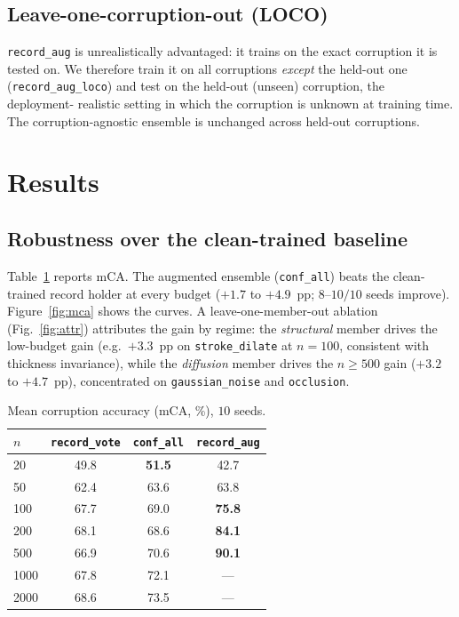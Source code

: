 \documentclass[conference]{IEEEtran}
\begin{document}
\subsection{Leave-one-corruption-out (LOCO)}
\texttt{record\_aug} is unrealistically advantaged: it trains on the exact corruption it is
tested on. We therefore train it on all corruptions \emph{except} the held-out one
(\texttt{record\_aug\_loco}) and test on the held-out (unseen) corruption, the deployment-%
realistic setting in which the corruption is unknown at training time. The
corruption-agnostic ensemble is unchanged across held-out corruptions.

\section{Results}
\subsection{Robustness over the clean-trained baseline}
Table~\ref{tab:mca} reports mCA. The augmented ensemble (\texttt{conf\_all}) beats the
clean-trained record holder at every budget ($+1.7$ to $+4.9$~pp; $8$--$10/10$ seeds improve).
Figure~\ref{fig:mca} shows the curves. A leave-one-member-out ablation
(Fig.~\ref{fig:attr}) attributes the gain by regime: the \emph{structural} member drives the
low-budget gain (e.g.\ $+3.3$~pp on \texttt{stroke\_dilate} at $n\!=\!100$, consistent with
thickness invariance), while the \emph{diffusion} member drives the $n\!\geq\!500$ gain
($+3.2$ to $+4.7$~pp), concentrated on \texttt{gaussian\_noise} and \texttt{occlusion}.

\begin{table}[t]
\caption{Mean corruption accuracy (mCA, \%), $10$ seeds.}
\label{tab:mca}
\centering
\begin{tabular}{@{}lccc@{}}
\toprule
$n$ & \texttt{record\_vote} & \texttt{conf\_all} & \texttt{record\_aug} \\
\midrule
20   & 49.8 & \textbf{51.5} & 42.7 \\
50   & 62.4 & 63.6 & 63.8 \\
100  & 67.7 & 69.0 & \textbf{75.8} \\
200  & 68.1 & 68.6 & \textbf{84.1} \\
500  & 66.9 & 70.6 & \textbf{90.1} \\
1000 & 67.8 & 72.1 & --- \\
2000 & 68.6 & 73.5 & --- \\
\bottomrule
\end{tabular}
\end{table}
\end{document}
